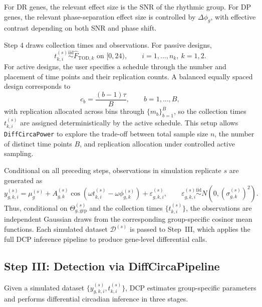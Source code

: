 \documentclass{article}
\newcommand{\software}[1]{\texttt{#1}}
\begin{document}
For DR genes, the relevant effect size is the SNR of the rhythmic group. For
DP genes, the relevant phase-separation effect size is controlled by
$\Delta\phi_g$, with effective contrast depending on both SNR and phase shift.

Step 4 draws collection times and observations. For passive designs,
\begin{equation}
t_{k,i}^{(s)}\overset{\mathrm{iid}}{\sim}\hat{F}_{\mathrm{TOD},k}
\text{ on }[0,24),
\qquad i=1,\ldots,n_k,\ k=1,2.
\label{eq:passive_times}
\end{equation}
For active designs, the user specifies a schedule through the number and
placement of time points and their replication counts. A balanced equally
spaced design corresponds to
\begin{equation}
c_b = \frac{(b-1)\tau}{B},\qquad b=1,\ldots,B,
\label{eq:active_bins}
\end{equation}
with replication allocated across bins through $\{m_b\}_{b=1}^B$, so the
collection times $t_{k,i}^{(s)}$ are assigned deterministically by the active
schedule.
This setup allows \software{DiffCircaPower} to explore the trade-off between total
sample size $n$, the number of distinct time points $B$, and replication
allocation under controlled active sampling.

Conditional on all preceding steps, observations in simulation replicate $s$
are generated as
\begin{equation}
y_{g,k,i}^{(s)}
=
\mu_g^{(s)}
+
A_{g,k}^{(s)}\cos(\omega t_{k,i}^{(s)}-\omega\phi_{g,k}^{(s)})
+
\varepsilon_{g,k,i}^{(s)},
\qquad
\varepsilon_{g,k,i}^{(s)}\overset{\mathrm{iid}}{\sim}N(0,(\sigma_{g,k}^{(s)})^2).
\label{eq:obs}
\end{equation}
Thus, conditional on $\Theta_{g,\mathrm{grp}}^{(s)}$ and the collection times
$\{t_{k,i}^{(s)}\}$, the observations are independent Gaussian draws from the
corresponding group-specific cosinor mean functions.
Each simulated dataset $\mathcal{D}^{(s)}$ is passed to Step~III, which
applies the full DCP inference pipeline to produce gene-level differential
calls.

\subsection{Step III: Detection via DiffCircaPipeline}
\label{sec:dcp}

Given a simulated dataset
$\{y_{g,k,i}^{(s)},t_{k,i}^{(s)}\}$, DCP estimates
group-specific parameters and performs differential circadian inference in
three stages.
\end{document}
